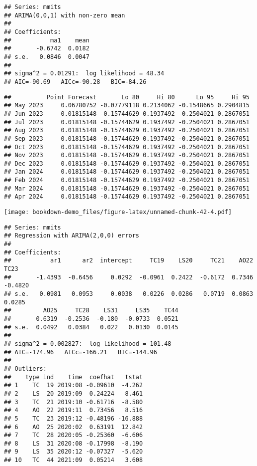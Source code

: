 \documentclass[
]{book}
\begin{document}
\begin{verbatim}
## Series: mmits 
## ARIMA(0,0,1) with non-zero mean 
## 
## Coefficients:
##           ma1    mean
##       -0.6742  0.0182
## s.e.   0.0846  0.0047
## 
## sigma^2 = 0.01291:  log likelihood = 48.34
## AIC=-90.69   AICc=-90.28   BIC=-84.26
\end{verbatim}

\begin{verbatim}
##          Point Forecast       Lo 80     Hi 80      Lo 95     Hi 95
## May 2023     0.06780752 -0.07779118 0.2134062 -0.1548665 0.2904815
## Jun 2023     0.01815148 -0.15744629 0.1937492 -0.2504021 0.2867051
## Jul 2023     0.01815148 -0.15744629 0.1937492 -0.2504021 0.2867051
## Aug 2023     0.01815148 -0.15744629 0.1937492 -0.2504021 0.2867051
## Sep 2023     0.01815148 -0.15744629 0.1937492 -0.2504021 0.2867051
## Oct 2023     0.01815148 -0.15744629 0.1937492 -0.2504021 0.2867051
## Nov 2023     0.01815148 -0.15744629 0.1937492 -0.2504021 0.2867051
## Dec 2023     0.01815148 -0.15744629 0.1937492 -0.2504021 0.2867051
## Jan 2024     0.01815148 -0.15744629 0.1937492 -0.2504021 0.2867051
## Feb 2024     0.01815148 -0.15744629 0.1937492 -0.2504021 0.2867051
## Mar 2024     0.01815148 -0.15744629 0.1937492 -0.2504021 0.2867051
## Apr 2024     0.01815148 -0.15744629 0.1937492 -0.2504021 0.2867051
\end{verbatim}

\texttt{[image: bookdown-demo\_files/figure-latex/unnamed-chunk-42-4.pdf]}

\begin{verbatim}
## Series: mmits 
## Regression with ARIMA(2,0,0) errors 
## 
## Coefficients:
##           ar1      ar2  intercept     TC19    LS20     TC21    AO22     TC23
##       -1.4393  -0.6456     0.0292  -0.0961  0.2422  -0.6172  0.7346  -0.4820
## s.e.   0.0981   0.0953     0.0038   0.0226  0.0286   0.0719  0.0863   0.0285
##         AO25     TC28    LS31     LS35    TC44
##       0.6319  -0.2536  -0.180  -0.0733  0.0521
## s.e.  0.0492   0.0384   0.022   0.0130  0.0145
## 
## sigma^2 = 0.002827:  log likelihood = 101.48
## AIC=-174.96   AICc=-166.21   BIC=-144.96
## 
## Outliers:
##    type ind    time  coefhat   tstat
## 1    TC  19 2019:08 -0.09610  -4.262
## 2    LS  20 2019:09  0.24224   8.461
## 3    TC  21 2019:10 -0.61716  -8.580
## 4    AO  22 2019:11  0.73456   8.516
## 5    TC  23 2019:12 -0.48196 -16.888
## 6    AO  25 2020:02  0.63191  12.842
## 7    TC  28 2020:05 -0.25360  -6.606
## 8    LS  31 2020:08 -0.17998  -8.190
## 9    LS  35 2020:12 -0.07327  -5.620
## 10   TC  44 2021:09  0.05214   3.608
\end{verbatim}
\end{document}

